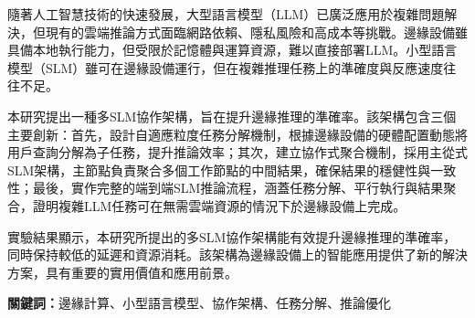 \begin{abstractzh}

隨著人工智慧技術的快速發展，大型語言模型（LLM）已廣泛應用於複雜問題解決，但現有的雲端推論方式面臨網路依賴、隱私風險和高成本等挑戰。邊緣設備雖具備本地執行能力，但受限於記憶體與運算資源，難以直接部署LLM。小型語言模型（SLM）雖可在邊緣設備運行，但在複雜推理任務上的準確度與反應速度往往不足。

本研究提出一種多SLM協作架構，旨在提升邊緣推理的準確率。該架構包含三個主要創新：首先，設計自適應粒度任務分解機制，根據邊緣設備的硬體配置動態將用戶查詢分解為子任務，提升推論效率；其次，建立協作式聚合機制，採用主從式SLM架構，主節點負責聚合多個工作節點的中間結果，確保結果的穩健性與一致性；最後，實作完整的端到端SLM推論流程，涵蓋任務分解、平行執行與結果聚合，證明複雜LLM任務可在無需雲端資源的情況下於邊緣設備上完成。

實驗結果顯示，本研究所提出的多SLM協作架構能有效提升邊緣推理的準確率，同時保持較低的延遲和資源消耗。該架構為邊緣設備上的智能應用提供了新的解決方案，具有重要的實用價值和應用前景。

\vspace{1cm}
\noindent\textbf{關鍵詞：}邊緣計算、小型語言模型、協作架構、任務分解、推論優化

\end{abstractzh}